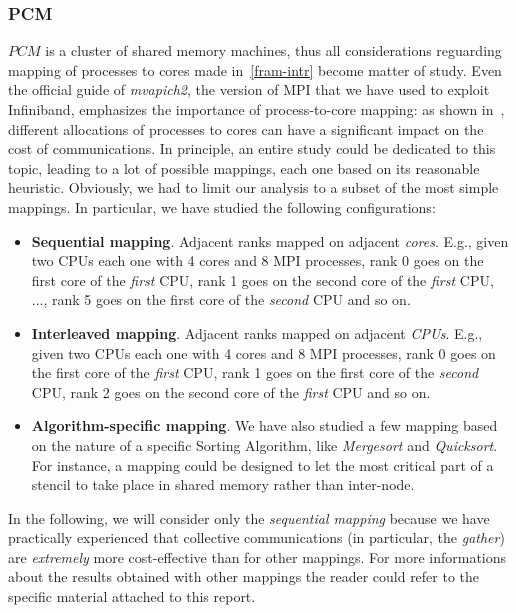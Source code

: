 \subsubsection{PCM}
$PCM$ is a cluster of shared memory machines, thus all considerations reguarding mapping of processes to cores made in~\ref{fram-intr} become matter of study. Even the official guide of \textit{mvapich2}, the version of MPI that we have used to exploit Infiniband, emphasizes the importance of process-to-core mapping: as shown in~\cite{MVAPICH2-MAPPING}, different allocations of processes to cores can have a significant impact on the cost of communications. In principle, an entire study could be dedicated to this topic, leading to a lot of possible mappings, each one based on its reasonable heuristic. Obviously, we had to limit our analysis to a subset of the most simple mappings. In particular, we have studied the following configurations:   
\begin{itemize}
\item \textbf{Sequential mapping}. Adjacent ranks mapped on adjacent \textit{cores}. E.g., given two CPUs each one with 4 cores and 8 MPI processes, rank 0 goes on the first core of the \textit{first} CPU, rank 1 goes on the second core of the \textit{first} CPU, ..., rank 5 goes on the first core of the \textit{second} CPU and so on.
\item \textbf{Interleaved mapping}. Adjacent ranks mapped on adjacent \textit{CPUs}. E.g., given two CPUs each one with 4 cores and 8 MPI processes, rank 0 goes on the first core of the \textit{first} CPU, rank 1 goes on the first core of the \textit{second} CPU, rank 2 goes on the second core of the \textit{first} CPU and so on.
\item \textbf{Algorithm-specific mapping}. We have also studied a few mapping based on the nature of a specific Sorting Algorithm, like \textit{Mergesort} and \textit{Quicksort}. For instance, a mapping could be designed to let the most critical part of a stencil to take place in shared memory rather than inter-node.  
\end{itemize}
In the following, we will consider only the \textit{sequential mapping} because we have practically experienced that collective communications (in particular, the \textit{gather}) are \textit{extremely} more cost-effective than for other mappings. For more informations about the results obtained with other mappings the reader could refer to the specific material attached to this report.


